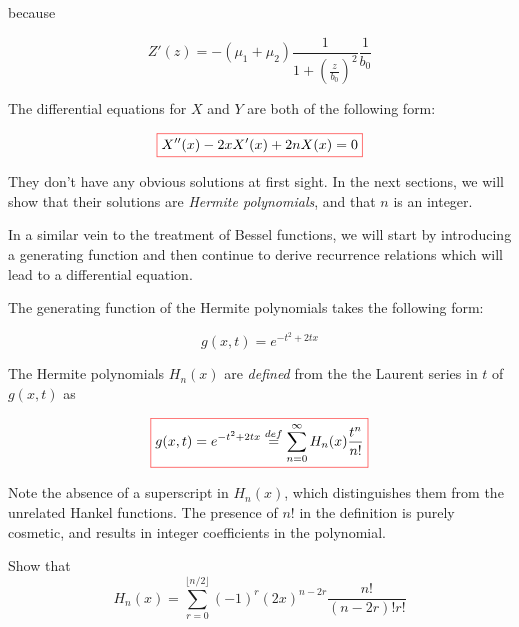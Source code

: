 because

\begin{equation}
Z'(z) = -(\mu_1+\mu_2) \frac{1}{1+\left(\frac{z}{b_0}\right)^2} \frac{1}{b_0}
\end{equation} 

The differential equations for $X$ and $Y$ are both of the following form: 

\begin{equation}
\fbox{$\displaystyle
X''(x) - 2 x X'(x) + 2 n X(x) = 0 \label{eq-diff-hermite-0}
$}
\end{equation} 

They don't have any obvious solutions at first sight. In the next sections, we will show that their solutions are \emph{Hermite polynomials}, and that $n$ is an integer.

In a similar vein to the treatment of Bessel functions, we will start by introducing a generating function and then continue to derive recurrence relations which will lead to a differential equation.

\pagebreak


The generating function of the Hermite polynomials takes the following form:

\begin{equation}
g(x,t) = e^{-t^2 + 2tx} \label{eq-gen-hermite}
\end{equation}

The Hermite polynomials $H_n(x)$ are \emph{defined} from the the Laurent series in $t$ of $g(x,t)$ as 

\noindent{}\begin{equation}
\fbox{$\displaystyle
  g(x,t) = e^{-t^2 + 2tx} \stackrel{def}{=} \sum_{n = 0}^{\infty} H_n(x)\frac{t^n}{n!} \label{eq-g-hermite}
$}
\end{equation} 

Note the absence of a superscript in $H_n(x)$, which distinguishes them from the unrelated Hankel functions. The presence of $n!$ in the definition is purely cosmetic, and results in integer coefficients in the polynomial.

\begin{exer}
\noindent{}Show that
$$H_n(x) = \sum_{r=0}^{\lfloor n/2 \rfloor}(-1)^r {(2x)}^{n-2r} \frac{n!}{(n-2r)! r!}$$
\end{exer}

